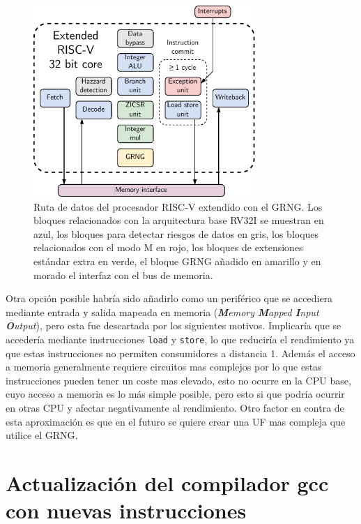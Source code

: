 \begin{figure}[h]
    \centering
    \includegraphics[width=0.75\textwidth]{root/Imagenes/5_riscv/extended_core.pdf}
    \caption{Ruta de datos del procesador RISC-V extendido con el GRNG. Los bloques relacionados con la arquitectura base RV32I se muestran en azul, los bloques para detectar riesgos de datos en gris, los bloques relacionados con el modo M en rojo, los bloques de extensiones estándar extra en verde, el bloque GRNG añadido en amarillo y en morado el interfaz con el bus de memoria.}
    \label{fig:extended_riscv_core}
\end{figure}



Otra opción posible habría sido añadirlo como un periférico que se accediera mediante entrada y salida mapeada en memoria (\textit{\textbf{M}emory \textbf{M}apped \textbf{I}nput \textbf{O}utput}), pero esta fue descartada por los siguientes motivos. Implicaría que se accedería mediante instrucciones \texttt{load} y \texttt{store}, lo que reduciría el rendimiento ya que estas instrucciones no permiten consumidores a distancia 1. Además el acceso a memoria generalmente requiere circuitos mas complejos por lo que estas instrucciones pueden tener un coste mas elevado, esto no ocurre en la CPU base, cuyo acceso a memoria es lo más simple posible, pero esto si que podría ocurrir en otras CPU y afectar negativamente al rendimiento. Otro factor en contra de esta aproximación es que en el futuro se quiere crear una UF mas compleja que utilice el GRNG.

\section{Actualización del compilador gcc con nuevas instrucciones}

